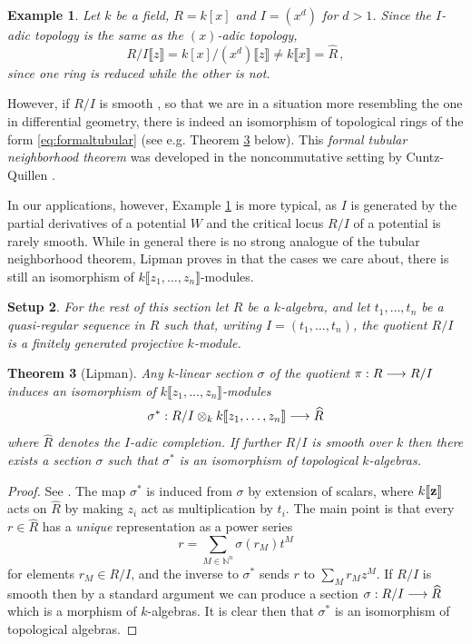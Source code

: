 \documentclass[english,letter paper,12pt,leqno]{article}
\newtheorem{theorem}{Theorem}[section]
\newtheorem{setup}[theorem]{Setup}
\theoremstyle{example}
\newtheorem{example}[theorem]{Example}
\numberwithin{equation}{section}
\def\be{\begin{equation}}
\def\ee{\end{equation}}
\begin{document}
\begin{example}\label{eq:example_nontub} Let $k$ be a field, $R = k[x]$ and $I = (x^d)$ for $d > 1$. Since the $I$-adic topology is the same as the $(x)$-adic topology, 
\[
R/I\llbracket z \rrbracket = k[x]/(x^d) \llbracket z \rrbracket \neq k\llbracket x \rrbracket = \widehat{R}\,,
\]
since one ring is reduced while the other is not.
\end{example}

However, if $R/I$ is smooth \cite[Definition 28.D]{matsumura}, so that we are in a situation more resembling the one in differential geometry, there is indeed an isomorphism of topological rings of the form \eqref{eq:formaltubular} (see e.g. Theorem \ref{prop_algtube} below). This \emph{formal tubular neighborhood theorem} was developed in the noncommutative setting by Cuntz-Quillen \cite[Theorem 2]{cuntzquillen}. 

In our applications, however, Example \ref{eq:example_nontub} is more typical, as $I$ is generated by the partial derivatives of a potential $W$ and the critical locus $R/I$ of a potential is rarely smooth. While in general there is no strong analogue of the tubular neighborhood theorem, Lipman proves in \cite{lipman} that the cases we care about, there is still an isomorphism of $k\llbracket z_1,\ldots,z_n \rrbracket$-modules.

\begin{setup} For the rest of this section let $R$ be a $k$-algebra, and let $t_1,\ldots,t_n$ be a quasi-regular sequence in $R$ such that, writing $I = (t_1,\ldots,t_n)$, the quotient $R/I$ is a finitely generated projective $k$-module.
\end{setup}

\begin{theorem}[Lipman]\label{prop_algtube} Any $k$-linear section $\sigma$ of the quotient $\pi: R \longrightarrow R/I$ induces an isomorphism of $k\llbracket z_1,\ldots,z_n \rrbracket$-modules
\[
\sigma^*: R/I \otimes_k k\llbracket z_1,\ldots,z_n \rrbracket \longrightarrow \widehat{R}
\]
where $\widehat{R}$ denotes the $I$-adic completion. If further $R/I$ is smooth over $k$ then there exists a section $\sigma$ such that $\sigma^*$ is an isomorphism of topological $k$-algebras.
\end{theorem}
\begin{proof}
See \cite[Lemma 3.3.2]{lipman}. The map $\sigma^*$ is induced from $\sigma$ by extension of scalars, where $k\llbracket \bold{z} \rrbracket$ acts on $\widehat{R}$ by making $z_i$ act as multiplication by $t_i$. The main point is that every $r \in \widehat{R}$ has a \emph{unique} representation as a power series
\be\label{eq:uniq_decompr}
r = \sum_{M \in \mathbb{N}^n} \sigma(r_M) t^M
\ee
for elements $r_M \in R/I$, and the inverse to $\sigma^*$ sends $r$ to $\sum_M r_M z^M$. If $R/I$ is smooth then by a standard argument \cite{matsumura} we can produce a section $\sigma: R/I \longrightarrow \widehat{R}$ which is a morphism of $k$-algebras. It is clear then that $\sigma^*$ is an isomorphism of topological algebras.
\end{proof}
\end{document}
